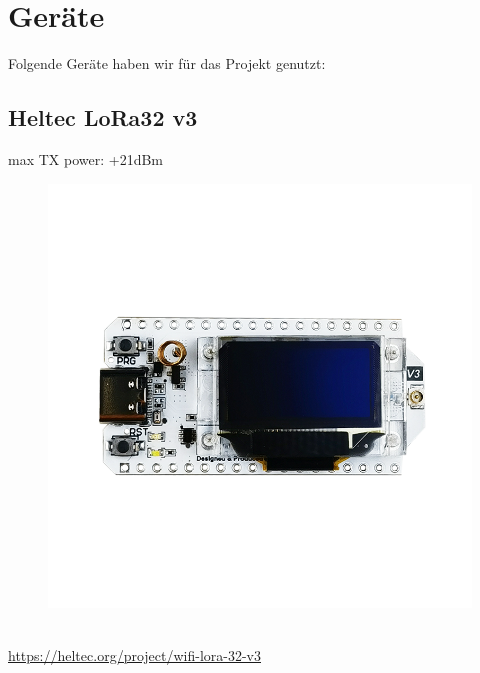 \documentclass[12pt,a4paper]{article}
\begin{document}
\newpage

\section{Geräte}

Folgende Geräte haben wir für das Projekt genutzt:

\subsection{Heltec LoRa32 v3}

max TX power: +21dBm\\
\begin{figure}[h]
	\includegraphics[scale=0.1]{./Bilder/Devices/heltec-lora32-v3.png}
\end{figure}\\
\url{https://heltec.org/project/wifi-lora-32-v3}\\
\end{document}
